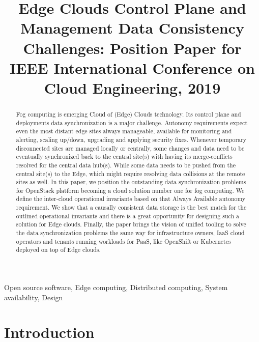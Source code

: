 \documentclass[conference]{IEEEtran}
\begin{document}
\title{Edge Clouds Control Plane and Management Data Consistency
Challenges: Position Paper for IEEE International Conference on Cloud
Engineering, 2019\\ }

\author{
}

\maketitle

\begin{abstract}
Fog computing is emerging Cloud of (Edge) Clouds technology. Its control plane
and deployments data synchronization is a major challenge. Autonomy requirements
expect even the most distant edge sites always manageable, available for
monitoring and alerting, scaling up/down, upgrading and applying security fixes.
Whenever temporary disconnected sites are managed locally or centrally, some
changes and data need to be eventually synchronized back to the central site(s)
with having its merge-conflicts resolved for the central data hub(s). While
some data needs to be pushed from the central site(s) to the Edge, which might
require resolving data collisions at the remote sites as well. In this paper,
we position the outstanding data synchronization problems for OpenStack
platform becoming a cloud solution number one for fog computing. We define the
inter-cloud operational invariants based on that Always Available autonomy
requirement. We show that a causally consistent data storage is the best
match for the outlined operational invariants and there is a great opportunity
for designing such a solution for Edge clouds. Finally, the paper brings the
vision of unified tooling to solve the data synchronization problems the same
way for infrastructure owners, IaaS cloud operators and tenants running
workloads for PaaS, like OpenShift or Kubernetes deployed on top of Edge
clouds.
\end{abstract}

\begin{IEEEkeywords}
Open source software, Edge computing, Distributed computing, System
availability, Design
\end{IEEEkeywords}

\section{Introduction}
\end{document}
